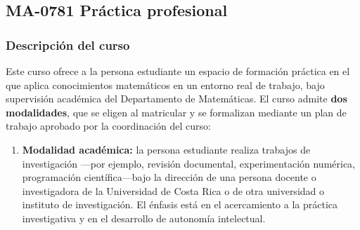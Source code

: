 \newpage
\subsection*{MA-0781 Práctica profesional}

\hypertarget{MA0781}{}
\begin{refsection}
\begin{table}[H]
\end{table}

\subsubsection*{Descripción del curso}

Este curso ofrece a la persona estudiante un espacio de formación práctica en el que aplica conocimientos matemáticos en un entorno real de trabajo, bajo supervisión académica del Departamento de Matemáticas. El curso admite \textbf{dos modalidades}, que se eligen al matricular y se formalizan mediante un plan de trabajo aprobado por la coordinación del curso:

\begin{enumerate}
\item \textbf{Modalidad académica:} la persona estudiante realiza trabajos de investigación ---por ejemplo, revisión documental, experimentación numérica, programación científica---bajo la dirección de una persona docente o investigadora de la Universidad de Costa Rica o de otra universidad o instituto de investigación. El énfasis está en el acercamiento a la práctica investigativa y en el desarrollo de autonomía intelectual.


\end{enumerate}
\end{refsection}
